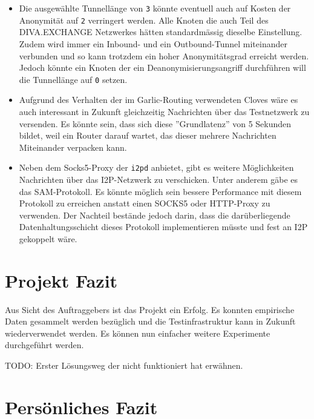 \begin{itemize}
 \item Die ausgewählte Tunnellänge von \lstinline|3| könnte eventuell auch auf Kosten der Anonymität auf \lstinline|2| verringert werden. Alle Knoten die auch Teil des DIVA.EXCHANGE Netzwerkes hätten standardmässig dieselbe Einstellung.
Zudem wird immer ein Inbound- und ein Outbound-Tunnel miteinander verbunden und so kann trotzdem ein hoher Anonymitätsgrad erreicht werden.
Jedoch könnte ein Knoten der ein Deanonymisierungsangriff durchführen will die Tunnellänge auf \lstinline|0| setzen.
  \item Aufgrund des Verhalten der im Garlic-Routing verwendeten Cloves wäre es auch interessant in Zukunft gleichzeitig Nachrichten über das Testnetzwerk zu versenden. Es könnte sein, dass sich diese ''Grundlatenz'' von 5 Sekunden bildet, weil ein Router darauf wartet, das dieser mehrere Nachrichten Miteinander verpacken kann.
  \item Neben dem Socks5-Proxy der \lstinline|i2pd| anbietet, gibt es weitere Möglichkeiten Nachrichten über das I2P-Netzwerk zu verschicken.
    Unter anderem gäbe es das SAM-Protokoll. Es könnte möglich sein bessere Performance mit diesem Protokoll zu erreichen anstatt einen SOCKS5 oder HTTP-Proxy zu verwenden. \cite{noauthor_sam_nodate}
    Der Nachteil bestände jedoch darin, dass die darüberliegende Datenhaltungsschicht dieses Protokoll implementieren müsste und fest an I2P gekoppelt wäre.
\end{itemize}


\section{Projekt Fazit}

Aus Sicht des Auftraggebers ist das Projekt ein Erfolg. Es konnten empirische Daten gesammelt werden bezüglich und die Testinfrastruktur kann in Zukunft wiederverwendet werden. Es können nun einfacher weitere Experimente durchgeführt werden.

TODO: Erster Lösungsweg der nicht funktioniert hat erwähnen.


\section{Persönliches Fazit}

